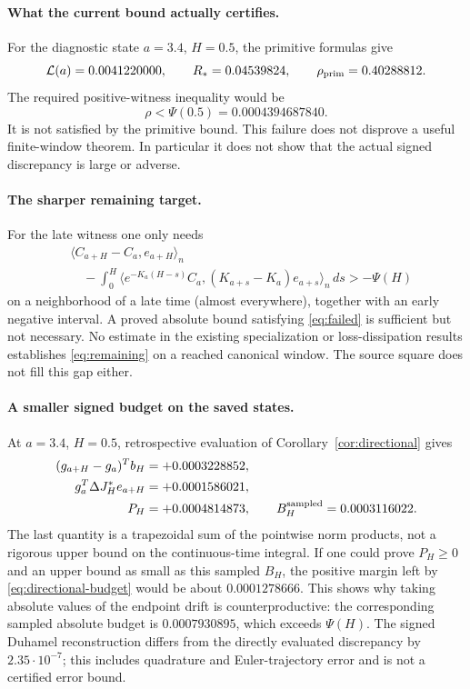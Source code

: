 \documentclass[10pt]{article}
\newcommand{\ip}[2]{\langle #1,#2\rangle_n}
\begin{document}
\paragraph{What the current bound actually certifies.}
For the diagnostic state $a=3.4$, $H=0.5$, the primitive formulas give
\[
 \mathcal L(a)=0.0041220000,\qquad R_*=0.04539824,
 \qquad \rho_{\rm prim}=0.40288812.
\]
The required positive-witness inequality would be
\begin{equation}\label{eq:failed}
 \rho < \Psi(0.5)=0.0004394687840.
\end{equation}
It is not satisfied by the primitive bound. This failure does not disprove
a useful finite-window theorem. In particular it does not show that the
actual signed discrepancy is large or adverse.

\paragraph{The sharper remaining target.}
For the late witness one only needs
\begin{equation}\label{eq:remaining}
\begin{split}
 &\ip{C_{a+H}-C_a}{e_{a+H}}\\
 &\quad-\int_0^H\ip{e^{-K_a(H-s)}C_a}{(K_{a+s}-K_a)e_{a+s}}\,ds
 >-\Psi(H)
\end{split}
\end{equation}
on a neighborhood of a late time (almost everywhere), together with an early
negative interval. A proved absolute bound satisfying \eqref{eq:failed} is
sufficient but not necessary. No estimate in the existing specialization or
loss-dissipation results establishes \eqref{eq:remaining} on a reached
canonical window. The source square does not fill this gap either.


\paragraph{A smaller signed budget on the saved states.}
At $a=3.4$, $H=0.5$, retrospective evaluation of
Corollary~\ref{cor:directional} gives
\begin{align*}
 (g_{a+H}-g_a)^Tb_H&=+0.0003228852,\\
 g_a^T\Delta J_H^*e_{a+H}&=+0.0001586021,\\
 P_H&=+0.0004814873,\qquad
 B_H^{\rm sampled}=0.0003116022.
\end{align*}
The last quantity is a trapezoidal sum of the pointwise norm products, not a
rigorous upper bound on the continuous-time integral. If one could prove
$P_H\ge0$ and an upper bound as small as this sampled $B_H$, the positive
margin left by \eqref{eq:directional-budget} would be about $0.0001278666$.
This shows why taking absolute values of the endpoint drift is counterproductive:
the corresponding sampled absolute budget is $0.0007930895$, which exceeds
$\Psi(H)$. The signed Duhamel reconstruction differs from the directly
evaluated discrepancy by $2.35\cdot10^{-7}$; this includes quadrature and
Euler-trajectory error and is not a certified error bound.
\end{document}
